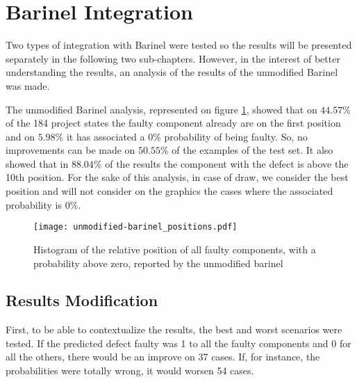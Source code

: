 

\section{Barinel Integration}


Two types of integration with Barinel were tested so the results will be presented separately in the following two sub-chapters. However, in the interest of better understanding the results, an analysis of the results of the unmodified Barinel was made.

The unmodified Barinel analysis, represented on figure \ref{fig:fault-positions}, showed that on $44.57\%$ of the 184 project states the faulty component already are on the first position and on $5.98\%$ it has associated a $0\%$ probability of being faulty. So, no improvements can be made on $50.55\%$ of the examples of the test set. It also showed that in $88.04\%$ of the results the component with the defect is above the 10th position. For the sake of this analysis, in case of draw, we consider the best position and will not consider on the graphics the cases where the associated probability is $0\%$.

\begin{figure}[!]
  \begin{center}
    \leavevmode
    \texttt{[image: unmodified-barinel\_positions.pdf]}
    \caption{Histogram of the relative position of all faulty components, with a probability above zero, reported by the unmodified barinel}
    \label{fig:fault-positions}
  \end{center}
\end{figure}


\subsection{Results Modification}

First, to be able to contextualize the results, the best and worst scenarios were tested. If the predicted defect faulty was 1 to all the faulty components and 0 for all the others, there would be an improve on 37 cases. If, for instance, the probabilities were totally wrong, it would worsen 54 cases.

